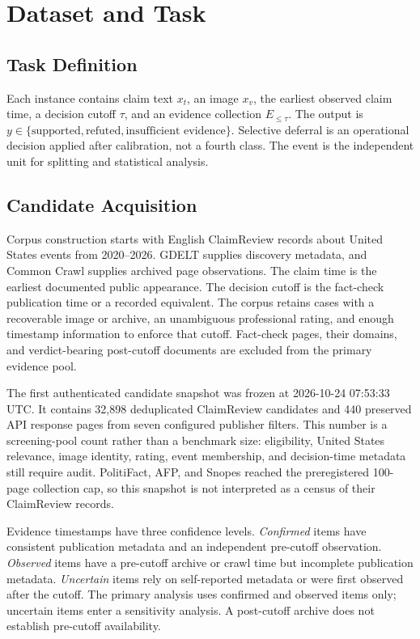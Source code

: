 \section{Dataset and Task}

\subsection{Task Definition}

Each instance contains claim text $x_t$, an image $x_v$, the earliest observed claim time, a decision cutoff $\tau$, and an evidence collection $E_{\leq\tau}$. The output is $y \in \{\text{supported},\text{refuted},\text{insufficient evidence}\}$. Selective deferral is an operational decision applied after calibration, not a fourth class. The event is the independent unit for splitting and statistical analysis.

\subsection{Candidate Acquisition}

Corpus construction starts with English ClaimReview records about United States events from 2020--2026. GDELT supplies discovery metadata, and Common Crawl supplies archived page observations. The claim time is the earliest documented public appearance. The decision cutoff is the fact-check publication time or a recorded equivalent. The corpus retains cases with a recoverable image or archive, an unambiguous professional rating, and enough timestamp information to enforce that cutoff. Fact-check pages, their domains, and verdict-bearing post-cutoff documents are excluded from the primary evidence pool.

The first authenticated candidate snapshot was frozen at 2026-10-24 07:53:33 UTC. It contains 32,898 deduplicated ClaimReview candidates and 440 preserved API response pages from seven configured publisher filters. This number is a screening-pool count rather than a benchmark size: eligibility, United States relevance, image identity, rating, event membership, and decision-time metadata still require audit. PolitiFact, AFP, and Snopes reached the preregistered 100-page collection cap, so this snapshot is not interpreted as a census of their ClaimReview records.

Evidence timestamps have three confidence levels. \emph{Confirmed} items have consistent publication metadata and an independent pre-cutoff observation. \emph{Observed} items have a pre-cutoff archive or crawl time but incomplete publication metadata. \emph{Uncertain} items rely on self-reported metadata or were first observed after the cutoff. The primary analysis uses confirmed and observed items only; uncertain items enter a sensitivity analysis. A post-cutoff archive does not establish pre-cutoff availability.

